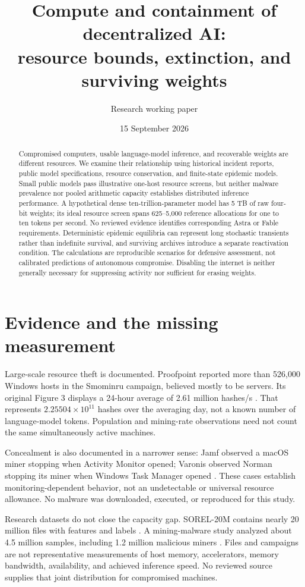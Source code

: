 \documentclass[10pt,twocolumn]{article}
\title{Compute and containment of decentralized AI:\\resource bounds, extinction, and surviving weights}
\author{Research working paper}
\date{15 September 2026}
\begin{document}
\maketitle
\begin{abstract}
Compromised computers, usable language-model inference, and recoverable weights are different resources. We examine their relationship using historical incident reports, public model specifications, resource conservation, and finite-state epidemic models. Small public models pass illustrative one-host resource screens, but neither malware prevalence nor pooled arithmetic capacity establishes distributed inference performance. A hypothetical dense ten-trillion-parameter model has 5 TB of raw four-bit weights; its ideal resource screen spans 625--5,000 reference allocations for one to ten tokens per second. No reviewed evidence identifies corresponding Astra or Fable requirements. Deterministic epidemic equilibria can represent long stochastic transients rather than indefinite survival, and surviving archives introduce a separate reactivation condition. The calculations are reproducible scenarios for defensive assessment, not calibrated predictions of autonomous compromise. Disabling the internet is neither generally necessary for suppressing activity nor sufficient for erasing weights.
\end{abstract}

\section{Evidence and the missing measurement}
Large-scale resource theft is documented. Proofpoint reported more than 526,000 Windows hosts in the Smominru campaign, believed mostly to be servers. Its original Figure 3 displays a 24-hour average of 2.61 million hashes/s \citep{smominru}. That represents $2.25504\times10^{11}$ hashes over the averaging day, not a known number of language-model tokens. Population and mining-rate observations need not count the same simultaneously active machines.

Concealment is also documented in a narrower sense: Jamf observed a macOS miner stopping when Activity Monitor opened; Varonis observed Norman stopping its miner when Windows Task Manager opened \citep{jamf,norman}. These cases establish monitoring-dependent behavior, not an undetectable or universal resource allowance. No malware was downloaded, executed, or reproduced for this study.

Research datasets do not close the capacity gap. SOREL-20M contains nearly 20 million files with features and labels \citep{sorel}. A mining-malware study analyzed about 4.5 million samples, including 1.2 million malicious miners \citep{mining}. Files and campaigns are not representative measurements of host memory, accelerators, memory bandwidth, availability, and achieved inference speed. No reviewed source supplies that joint distribution for compromised machines.
\end{document}

